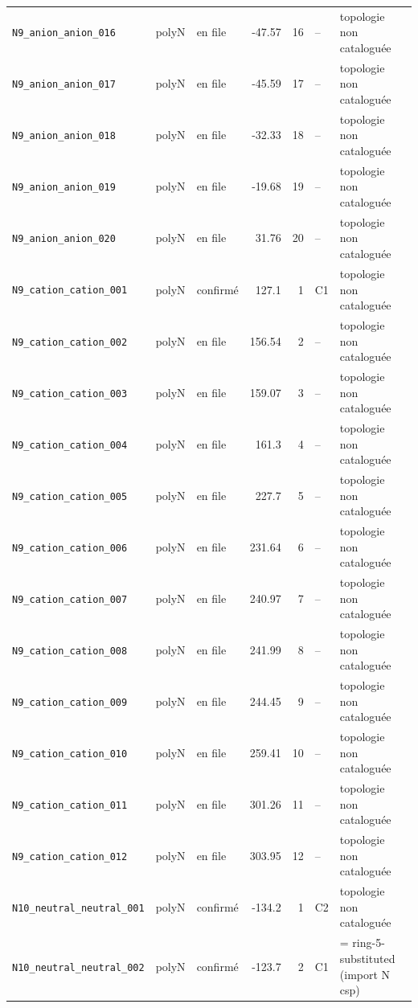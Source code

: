 \begin{longtable}{@{}p{4.2cm}cp{1.3cm}rrp{1.2cm}p{2.6cm}@{}}
\texttt{N9\_anion\_anion\_016} & polyN & en file & -47.57 & 16 & -- & topologie non catalogu\'ee \\
\texttt{N9\_anion\_anion\_017} & polyN & en file & -45.59 & 17 & -- & topologie non catalogu\'ee \\
\texttt{N9\_anion\_anion\_018} & polyN & en file & -32.33 & 18 & -- & topologie non catalogu\'ee \\
\texttt{N9\_anion\_anion\_019} & polyN & en file & -19.68 & 19 & -- & topologie non catalogu\'ee \\
\texttt{N9\_anion\_anion\_020} & polyN & en file & 31.76 & 20 & -- & topologie non catalogu\'ee \\
\addlinespace
\texttt{N9\_cation\_cation\_001} & polyN & confirm\'e & 127.1 & 1 & C1 & topologie non catalogu\'ee \\
\texttt{N9\_cation\_cation\_002} & polyN & en file & 156.54 & 2 & -- & topologie non catalogu\'ee \\
\texttt{N9\_cation\_cation\_003} & polyN & en file & 159.07 & 3 & -- & topologie non catalogu\'ee \\
\texttt{N9\_cation\_cation\_004} & polyN & en file & 161.3 & 4 & -- & topologie non catalogu\'ee \\
\texttt{N9\_cation\_cation\_005} & polyN & en file & 227.7 & 5 & -- & topologie non catalogu\'ee \\
\texttt{N9\_cation\_cation\_006} & polyN & en file & 231.64 & 6 & -- & topologie non catalogu\'ee \\
\texttt{N9\_cation\_cation\_007} & polyN & en file & 240.97 & 7 & -- & topologie non catalogu\'ee \\
\texttt{N9\_cation\_cation\_008} & polyN & en file & 241.99 & 8 & -- & topologie non catalogu\'ee \\
\texttt{N9\_cation\_cation\_009} & polyN & en file & 244.45 & 9 & -- & topologie non catalogu\'ee \\
\texttt{N9\_cation\_cation\_010} & polyN & en file & 259.41 & 10 & -- & topologie non catalogu\'ee \\
\texttt{N9\_cation\_cation\_011} & polyN & en file & 301.26 & 11 & -- & topologie non catalogu\'ee \\
\texttt{N9\_cation\_cation\_012} & polyN & en file & 303.95 & 12 & -- & topologie non catalogu\'ee \\
\addlinespace
\texttt{N10\_neutral\_neutral\_001} & polyN & confirm\'e & -134.2 & 1 & C2 & topologie non catalogu\'ee \\
\texttt{N10\_neutral\_neutral\_002} & polyN & confirm\'e & -123.7 & 2 & C1 & = ring-5-substituted (import N csp) \\

\end{longtable}
